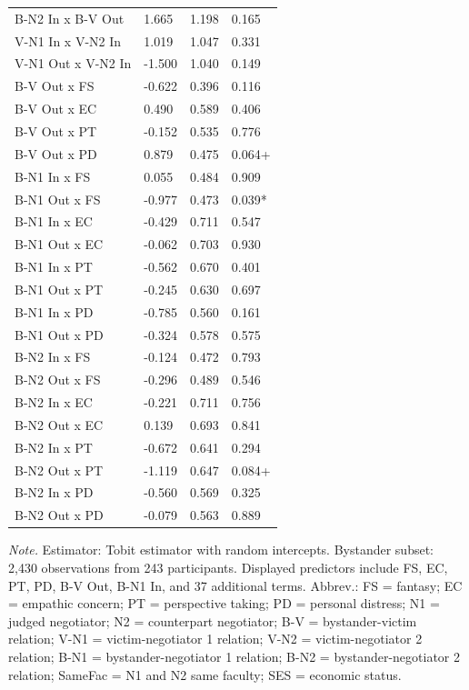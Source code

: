 \documentclass[11pt]{article}
\begin{document}
\begin{table}[H]
{\begin{tabularx}{\textwidth}{>{\raggedright\arraybackslash}Xlll}
B-N2 In x B-V Out & 1.665 & 1.198 & 0.165 \\
V-N1 In x V-N2 In & 1.019 & 1.047 & 0.331 \\
V-N1 Out x V-N2 In & -1.500 & 1.040 & 0.149 \\
B-V Out x FS & -0.622 & 0.396 & 0.116 \\
B-V Out x EC & 0.490 & 0.589 & 0.406 \\
B-V Out x PT & -0.152 & 0.535 & 0.776 \\
B-V Out x PD & 0.879 & 0.475 & 0.064+ \\
B-N1 In x FS & 0.055 & 0.484 & 0.909 \\
B-N1 Out x FS & -0.977 & 0.473 & 0.039* \\
B-N1 In x EC & -0.429 & 0.711 & 0.547 \\
B-N1 Out x EC & -0.062 & 0.703 & 0.930 \\
B-N1 In x PT & -0.562 & 0.670 & 0.401 \\
B-N1 Out x PT & -0.245 & 0.630 & 0.697 \\
B-N1 In x PD & -0.785 & 0.560 & 0.161 \\
B-N1 Out x PD & -0.324 & 0.578 & 0.575 \\
B-N2 In x FS & -0.124 & 0.472 & 0.793 \\
B-N2 Out x FS & -0.296 & 0.489 & 0.546 \\
B-N2 In x EC & -0.221 & 0.711 & 0.756 \\
B-N2 Out x EC & 0.139 & 0.693 & 0.841 \\
B-N2 In x PT & -0.672 & 0.641 & 0.294 \\
B-N2 Out x PT & -1.119 & 0.647 & 0.084+ \\
B-N2 In x PD & -0.560 & 0.569 & 0.325 \\
B-N2 Out x PD & -0.079 & 0.563 & 0.889 \\
\bottomrule
\end{tabularx}
}
\end{table}
\begin{flushleft}
\footnotesize\textit{Note.} Estimator: Tobit estimator with random intercepts. Bystander subset: 2,430 observations from 243 participants. Displayed predictors include FS, EC, PT, PD, B-V Out, B-N1 In, and 37 additional terms. Abbrev.: FS = fantasy; EC = empathic concern; PT = perspective taking; PD = personal distress; N1 = judged negotiator; N2 = counterpart negotiator; B-V = bystander-victim relation; V-N1 = victim-negotiator 1 relation; V-N2 = victim-negotiator 2 relation; B-N1 = bystander-negotiator 1 relation; B-N2 = bystander-negotiator 2 relation; SameFac = N1 and N2 same faculty; SES = economic status.
\end{flushleft}
\end{document}

